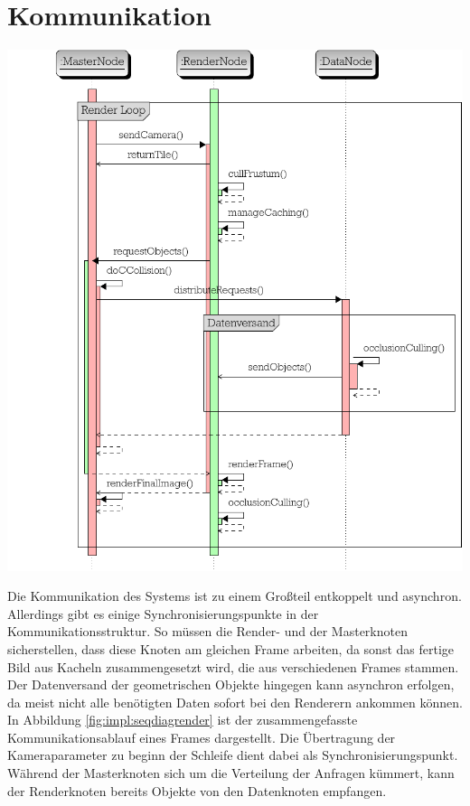 \section{Kommunikation}
\label{sec:impl:kommunikation}
\begin{Bild}
\includegraphics[scale=0.85]{images/seq_diag_render.pdf}
\end{Bild}

Die Kommunikation des Systems ist zu einem Großteil entkoppelt und asynchron. Allerdings gibt es einige Synchronisierungspunkte in der Kommunikationsstruktur. So müssen die Render- und der Masterknoten sicherstellen, dass diese Knoten am gleichen Frame arbeiten, da sonst das fertige Bild aus Kacheln zusammengesetzt wird, die aus verschiedenen Frames stammen. Der Datenversand der geometrischen Objekte hingegen kann asynchron erfolgen, da meist nicht alle benötigten Daten sofort bei den Renderern ankommen können. In Abbildung \ref{fig:impl:seqdiagrender} ist der zusammengefasste Kommunikationsablauf eines Frames dargestellt. Die Übertragung der Kameraparameter zu beginn der Schleife dient dabei als Synchronisierungspunkt. Während der Masterknoten sich um die Verteilung der Anfragen kümmert, kann der Renderknoten bereits Objekte von den Datenknoten empfangen.

